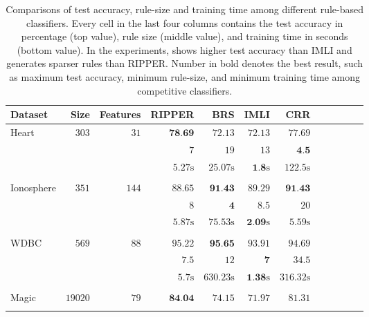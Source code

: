 \begin{table}
	\caption[Accuracy, rule-size, and training time of rule-based classifiers]{Comparisons of test accuracy, rule-size and training time among different rule-based classifiers. Every cell in the last four columns contains the test accuracy in percentage (top value), rule size  (middle value), and  training time in seconds (bottom value). In the experiments, {\crr} shows higher test accuracy than IMLI and generates sparser rules than RIPPER. Number in bold denotes the best result, such as maximum test accuracy, minimum rule-size, and minimum training time among competitive classifiers.}
	\label{interpretability_crr_tab:rule_based_classifiers}
	\begin{center}
		\begin{tabular}{l  r  r r r r r r r rrr}
			\toprule
			{{Dataset}} & Size & Features  & RIPPER & BRS & IMLI & CRR\\
			\midrule
			{ Heart}   & $  303 $  & $  31 $  & $   \textbf{78.69}  $    & $   72.13  $    & $   72.13  $    & $   77.69  $   \\ & & 
			& $   7 $    & $   19 $    & $   13 $    & $   \textbf{4.5}  $   \\ & & 
			& $   5.27 \text{s}  $    & $   25.07 \text{s}  $    & $   \textbf{1.8} \text{s}  $    & $   122.5 \text{s}  $   \\\\
			{ Ionosphere}   & $  351 $  & $  144 $  & $   88.65  $    & $   \textbf{91.43}  $    & $   89.29  $    & $   \textbf{91.43}  $   \\ & & 
			& $   8 $    & $   \textbf{4} $    & $   8.5  $    & $   20 $   \\ & & 
			& $   5.87 \text{s}  $    & $   75.53 \text{s}  $    & $   \textbf{2.09} \text{s}  $    & $   5.59 \text{s}  $   \\\\ 
			{ WDBC}   & $  569 $  & $  88 $  & $   95.22  $    & $   \textbf{95.65}  $    & $   93.91  $    & $   94.69  $   \\ & & 
			& $   7.5  $    & $   12 $    & $   \textbf{7} $    & $   34.5  $   \\ & & 
			& $   5.7 \text{s}  $    & $   630.23 \text{s}  $    & $   \textbf{1.38} \text{s}  $    & $   316.32 \text{s}  $   \\\\ 
			{ Magic}   & $  19020 $  & $  79 $  & $   \textbf{84.04}  $    & $   74.15  $    & $   71.97  $    & $   81.31  $   \\ & & 

\end{tabular}
\end{center}
\end{table}
